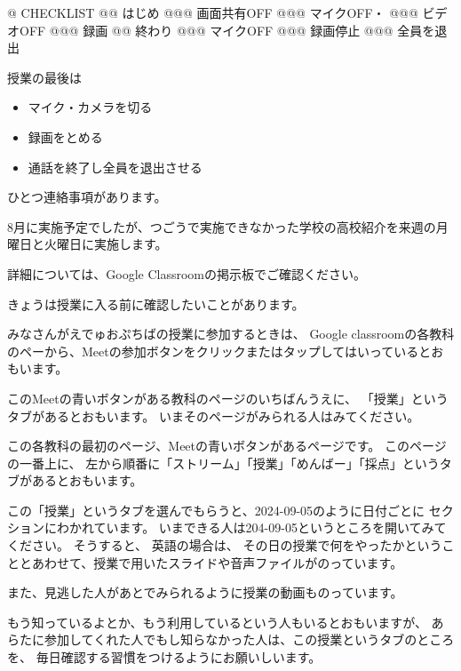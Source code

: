 \documentclass[12pt,jafontscale=0.9247]{jlreq}
\begin{document}


\begin{minipage}[t]{70mm}
\begin{easylist}[checklist]
@ CHECKLIST
@@ はじめ
@@@ 画面共有OFF
@@@ マイクOFF・
@@@ ビデオOFF
@@@ 録画
@@ 終わり
@@@ マイクOFF
@@@ 録画停止
@@@ 全員を退出
\end{easylist}
\end{minipage}


\newpage



\textsf{授業の最後は}

\begin{itemize}\gtfamily
 \item マイク・カメラを切る
 \item 録画をとめる
 \item 通話を終了し全員を退出させる
\end{itemize}


\newpage

ひとつ連絡事項があります。

8月に実施予定でしたが、つごうで実施できなかった学校の高校紹介を来週の月曜日と火曜日に実施します。

詳細については、Google Classroomの掲示板でご確認ください。


\newpage

きょうは授業に入る前に確認したいことがあります。

みなさんがえでゅおぷちばの授業に参加するときは、
Google classroomの各教科のペーから、Meetの参加ボタンをクリックまたはタップしてはいっているとおもいます。

このMeetの青いボタンがある教科のページのいちばんうえに、
「授業」というタブがあるとおもいます。
いまそのページがみられる人はみてください。

この各教科の最初のページ、Meetの青いボタンがあるページです。
このページの一番上に、
左から順番に「ストリーム」「授業」「めんばー」「採点」というタブがあるとおもいます。

この「授業」というタブを選んでもらうと、2024-09-05のように日付ごとに
セクションにわかれています。
いまできる人は204-09-05というところを開いてみてください。
そうすると、
英語の場合は、
その日の授業で何をやったかということとあわせて、授業で用いたスライドや音声ファイルがのっています。

また、見逃した人があとでみられるように授業の動画ものっています。

もう知っているよとか、もう利用しているという人もいるとおもいますが、
あらたに参加してくれた人でもし知らなかった人は、この授業というタブのところを、
毎日確認する習慣をつけるようにお願いしいます。
\end{document}
